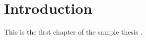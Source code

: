 \chapter{Introduction}

This is the first chapter of the sample thesis 
\cite{turabian87,re:thesisguide}.

